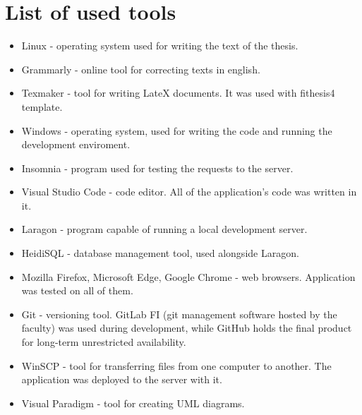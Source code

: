 \documentclass[
  digital,     %
  oneside,     %
  nosansbold,  %
  colorbold, %
  lof,         %
  lot,         %
]{fithesis4}
\begin{document}

\chapter*{List of used tools}
\begin{itemize}
	\item Linux - operating system used for writing the text of the thesis.

	\item Grammarly - online tool for correcting texts in english.

	\item Texmaker - tool for writing LateX documents. It was used with
	fithesis4 template.

	\item Windows - operating system, used for writing the code and running
	the development enviroment.
	
	\item Insomnia - program used for testing the requests to the server.

	\item Visual Studio Code - code editor. All of the application's code was written in it.

	\item Laragon - program capable of running a local development server.

	\item HeidiSQL - database management tool, used alongside Laragon.

	\item Mozilla Firefox, Microsoft Edge, Google Chrome - web browsers.
	Application was tested on all of them.

	\item Git - versioning tool. GitLab FI (git management software hosted by
	the faculty) was used during development, while GitHub holds the final
	product for long-term unrestricted availability.

	\item WinSCP - tool for transferring files from one computer to another.
	The application was deployed to the server with it.

	\item Visual Paradigm - tool for creating UML diagrams.
\end{itemize}
\end{document}
